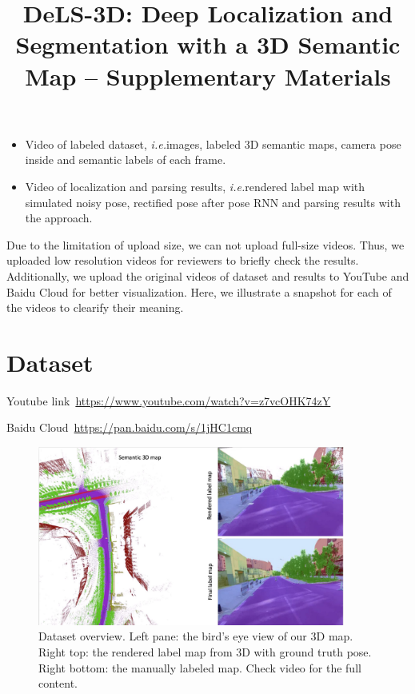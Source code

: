 \documentclass[10pt,twocolumn,letterpaper]{article}
\def\ie{\emph{i.e.}}
\begin{document}
\onecolumn
\title{DeLS-3D: Deep Localization and Segmentation with a 3D Semantic Map -- Supplementary Materials}
\maketitle

\begin{itemize}
\vspace{-0.5\baselineskip}
    \setlength{\itemsep}{-2pt}
    \item Video of labeled dataset, \ie images, labeled 3D semantic maps, camera pose inside and semantic labels of each frame.
    \item Video of localization and parsing results, \ie rendered label map with simulated noisy pose, rectified pose after pose RNN and parsing results with the approach.
\vspace{-0.4\baselineskip}
\end{itemize}

Due to the limitation of upload size, we can not upload full-size videos. Thus, we uploaded low resolution videos for reviewers to briefly check the results. 
Additionally, we upload the original videos of dataset and results to YouTube and Baidu Cloud for better visualization. Here, we illustrate a snapshot for each of the videos to clearify their meaning.

\section{Dataset} 
Youtube link~\url{https://www.youtube.com/watch?v=z7vcOHK74zY}

Baidu Cloud~\url{https://pan.baidu.com/s/1jHC1cmq}

\begin{figure}[!hbpt]
\center
\includegraphics[width=0.9\textwidth]{fig/dataset_video.pdf}
\caption{Dataset overview. Left pane: the bird's eye view of our 3D map. Right top: the rendered label map from 3D with ground truth pose. Right bottom: the manually labeled map. Check video for the full content.}
\label{fig:framework}
\end{figure}
\end{document}

